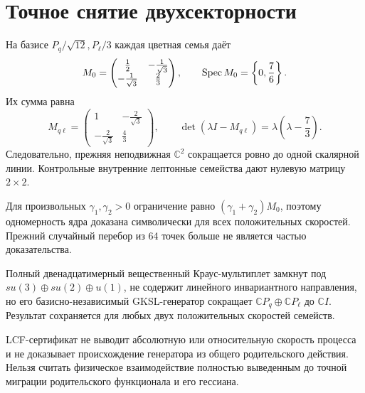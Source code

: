 \section{Точное снятие двухсекторности}

На базисе $P_q/\sqrt{12},P_\ell/3$ каждая цветная семья даёт
\begin{equation}
 M_0=\begin{pmatrix}
 \frac12&-\frac1{\sqrt3}\\
 -\frac1{\sqrt3}&\frac23
 \end{pmatrix},
 \qquad \operatorname{Spec} M_0=\left\{0,\frac76\right\}.
\end{equation}
Их сумма равна
\begin{equation}
 M_{q\ell}=\begin{pmatrix}
 1&-\frac2{\sqrt3}\\
 -\frac2{\sqrt3}&\frac43
 \end{pmatrix},
 \qquad
 \det(\lambda I-M_{q\ell})=\lambda\left(\lambda-\frac73\right).
 \label{eq:v8-lcf-cross-central-matrix}
\end{equation}
Следовательно, прежняя неподвижная $\mathbb C^2$ сокращается ровно до
одной скалярной линии. Контрольные внутренние лептонные семейства дают
нулевую матрицу $2\times2$.

Для произвольных $\gamma_1,\gamma_2>0$ ограничение равно
$(\gamma_1+\gamma_2)M_0$, поэтому одномерность ядра доказана символически
для всех положительных скоростей. Прежний случайный перебор из 64 точек больше
не является частью доказательства.

\begin{theorem}
Полный двенадцатимерный вещественный Краус-мультиплет замкнут под
$su(3)\oplus su(2)\oplus u(1)$, не содержит линейного инвариантного
направления, но его базисно-независимый GKSL-генератор сокращает
$\mathbb CP_q\oplus\mathbb CP_\ell$ до $\mathbb CI$. Результат сохраняется
для любых двух положительных скоростей семейств.
\end{theorem}

\begin{nogocriterion}
LCF-сертификат не выводит абсолютную или относительную скорость процесса и
не доказывает происхождение генератора из общего родительского действия. Нельзя
считать физическое взаимодействие полностью выведенным до точной миграции
родительского функционала и его гессиана.
\end{nogocriterion}

